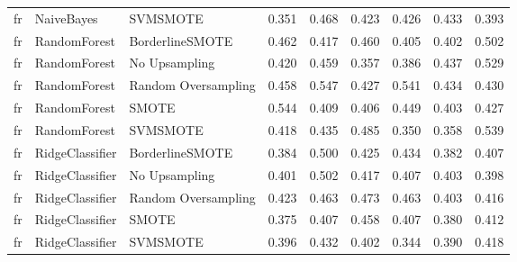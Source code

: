 \begin{tabular}{lllllllll}
      fr &                   NaiveBayes &            SVMSMOTE & 0.351 &                     0.468 &                 0.423 &                  0.426 &                                   0.433 &     0.393 \\
      fr &                 RandomForest &     BorderlineSMOTE & 0.462 &                     0.417 &                 0.460 &                  0.405 &                                   0.402 &     0.502 \\
      fr &                 RandomForest &       No Upsampling & 0.420 &                     0.459 &                 0.357 &                  0.386 &                                   0.437 &     0.529 \\
      fr &                 RandomForest & Random Oversampling & 0.458 &                     0.547 &                 0.427 &                  0.541 &                                   0.434 &     0.430 \\
      fr &                 RandomForest &               SMOTE & 0.544 &                     0.409 &                 0.406 &                  0.449 &                                   0.403 &     0.427 \\
      fr &                 RandomForest &            SVMSMOTE & 0.418 &                     0.435 &                 0.485 &                  0.350 &                                   0.358 &     0.539 \\
      fr &              RidgeClassifier &     BorderlineSMOTE & 0.384 &                     0.500 &                 0.425 &                  0.434 &                                   0.382 &     0.407 \\
      fr &              RidgeClassifier &       No Upsampling & 0.401 &                     0.502 &                 0.417 &                  0.407 &                                   0.403 &     0.398 \\
      fr &              RidgeClassifier & Random Oversampling & 0.423 &                     0.463 &                 0.473 &                  0.463 &                                   0.403 &     0.416 \\
      fr &              RidgeClassifier &               SMOTE & 0.375 &                     0.407 &                 0.458 &                  0.407 &                                   0.380 &     0.412 \\
      fr &              RidgeClassifier &            SVMSMOTE & 0.396 &                     0.432 &                 0.402 &                  0.344 &                                   0.390 &     0.418 \\

\end{tabular}
